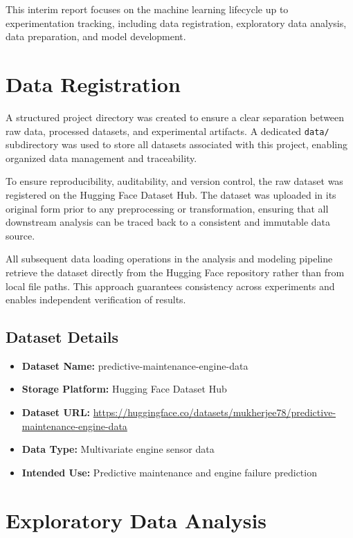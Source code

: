 \documentclass[11pt,a4paper]{article}
\begin{document}
This interim report focuses on the machine learning lifecycle up to experimentation tracking, including data registration, exploratory data analysis, data preparation, and model development.

\section{Data Registration}

A structured project directory was created to ensure a clear separation between raw data, processed datasets, and experimental artifacts. A dedicated \texttt{data/} subdirectory was used to store all datasets associated with this project, enabling organized data management and traceability.

To ensure reproducibility, auditability, and version control, the raw dataset was registered on the Hugging Face Dataset Hub. The dataset was uploaded in its original form prior to any preprocessing or transformation, ensuring that all downstream analysis can be traced back to a consistent and immutable data source.

All subsequent data loading operations in the analysis and modeling pipeline retrieve the dataset directly from the Hugging Face repository rather than from local file paths. This approach guarantees consistency across experiments and enables independent verification of results.

\subsection*{Dataset Details}

\begin{itemize}
    \item \textbf{Dataset Name:} predictive-maintenance-engine-data
    \item \textbf{Storage Platform:} Hugging Face Dataset Hub
	\item \textbf{Dataset URL:} \url{https://huggingface.co/datasets/mukherjee78/predictive-maintenance-engine-data}
    \item \textbf{Data Type:} Multivariate engine sensor data
    \item \textbf{Intended Use:} Predictive maintenance and engine failure prediction
\end{itemize}

\newpage


\section{Exploratory Data Analysis}
\end{document}

